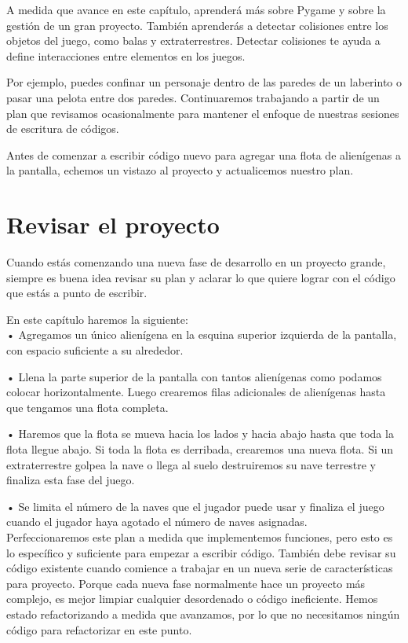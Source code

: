 A medida que avance en este capítulo, aprenderá más sobre Pygame y sobre la gestión de un gran proyecto. También aprenderás a detectar colisiones entre los objetos del juego, como balas y extraterrestres. Detectar colisiones te ayuda a define interacciones 
entre elementos en los juegos. 

Por ejemplo, puedes confinar un personaje dentro de las paredes de un laberinto o pasar una pelota entre dos paredes. Continuaremos trabajando a partir de un plan que revisamos ocasionalmente para mantener el enfoque de nuestras sesiones de escritura de códigos.

Antes de comenzar a escribir código nuevo para agregar una flota de alienígenas a la pantalla, echemos un vistazo al proyecto y actualicemos nuestro plan.



\section{Revisar el proyecto}


Cuando estás comenzando una nueva fase de desarrollo en un proyecto grande, siempre es buena idea revisar su plan y aclarar lo que quiere
lograr con el código que estás a punto de escribir. 

En este capítulo haremos la siguiente:\\

• Agregamos un único alienígena en la esquina superior izquierda de la pantalla, con espacio suficiente  a su alrededor.

• Llena la parte superior de la pantalla con tantos alienígenas como podamos colocar  horizontalmente. Luego crearemos filas adicionales de alienígenas hasta que tengamos una flota completa.

• Haremos que la flota se mueva hacia los lados y hacia abajo hasta que toda la flota llegue abajo. Si toda la flota es derribada, crearemos una nueva flota.  Si un extraterrestre golpea la nave o llega al suelo destruiremos su nave terrestre y finaliza esta fase del juego.  

• Se limita el número de la naves que el jugador puede usar y finaliza el juego cuando el jugador haya agotado el número de naves asignadas.\\ 


Perfeccionaremos este plan a medida que implementemos funciones, pero esto es lo específico y suficiente para empezar a escribir código.
También debe revisar su código existente cuando comience a trabajar en un nueva serie de características para  proyecto. 
Porque cada nueva fase normalmente hace un proyecto más complejo, es mejor limpiar cualquier desordenado o 
código ineficiente. Hemos estado refactorizando a medida que avanzamos, por lo que no necesitamos ningún código
para refactorizar en este punto.

